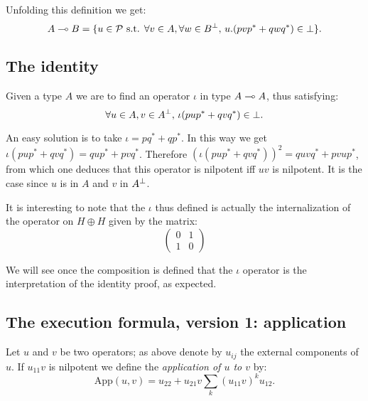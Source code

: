 Unfolding this definition we get:
\begin{equation*}
A\multimap B = \{u\in\mathcal{P}\text{ s.t. } \forall v\in A, \forall w\in B^\bot,\, u.(pvp^* + qwq^*) \in\bot\}.
\end{equation*}

\subsection{The identity}\label{the-identity}

Given a type \(A\) we are to find an operator \(\iota\) in type
\(A\multimap A\), thus satisfying:
\begin{equation*}
\forall u\in A, v\in A^\bot,\, \iota(pup^* + qvq^*)\in\bot.
\end{equation*}

An easy solution is to take \(\iota = pq^* + qp^*\). In this way we get
\(\iota(pup^* + qvq^*) = qup^* + pvq^*\). Therefore
\((\iota(pup^* + qvq^*))^2 = quvq^* + pvup^*\), from which one deduces
that this operator is nilpotent iff \(uv\) is nilpotent. It is the case
since \(u\) is in \(A\) and \(v\) in \(A^\bot\).

It is interesting to note that the \(\iota\) thus defined is actually
the internalization of the operator on \(H\oplus H\) given by the
matrix:
\begin{equation*}
  \begin{pmatrix}0 & 1\\1 & 0\end{pmatrix}
\end{equation*}

We will see once the composition is defined that the \(\iota\) operator
is the interpretation of the identity proof, as expected.

\subsection{The execution formula, version 1: application}\label{the-execution-formula-version-1-application}

\begin{definition}
Let $u$ and $v$ be two operators; as above denote by $u_{ij}$ the external components of $u$. If $u_{11}v$ is nilpotent we define the \emph{application of $u$ to $v$} by:
\begin{equation*}
\mathrm{App}(u,v) = u_{22} + u_{21}v\sum_k(u_{11}v)^ku_{12}.
\end{equation*}
\end{definition}


